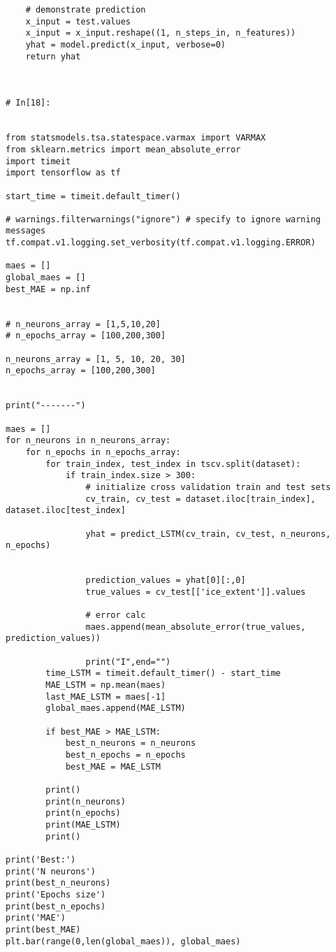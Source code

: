 \begin{verbatim}
    # demonstrate prediction
    x_input = test.values
    x_input = x_input.reshape((1, n_steps_in, n_features))
    yhat = model.predict(x_input, verbose=0)
    return yhat
    


# In[18]:


from statsmodels.tsa.statespace.varmax import VARMAX
from sklearn.metrics import mean_absolute_error
import timeit
import tensorflow as tf

start_time = timeit.default_timer()

# warnings.filterwarnings("ignore") # specify to ignore warning messages
tf.compat.v1.logging.set_verbosity(tf.compat.v1.logging.ERROR)

maes = []
global_maes = []
best_MAE = np.inf


# n_neurons_array = [1,5,10,20]
# n_epochs_array = [100,200,300]

n_neurons_array = [1, 5, 10, 20, 30]
n_epochs_array = [100,200,300]


print("-------")

maes = []
for n_neurons in n_neurons_array:
    for n_epochs in n_epochs_array:
        for train_index, test_index in tscv.split(dataset):
            if train_index.size > 300:
                # initialize cross validation train and test sets
                cv_train, cv_test = dataset.iloc[train_index], dataset.iloc[test_index]

                yhat = predict_LSTM(cv_train, cv_test, n_neurons, n_epochs)


                prediction_values = yhat[0][:,0]
                true_values = cv_test[['ice_extent']].values

                # error calc
                maes.append(mean_absolute_error(true_values, prediction_values))

                print("I",end="")
        time_LSTM = timeit.default_timer() - start_time
        MAE_LSTM = np.mean(maes)
        last_MAE_LSTM = maes[-1]
        global_maes.append(MAE_LSTM)

        if best_MAE > MAE_LSTM:
            best_n_neurons = n_neurons
            best_n_epochs = n_epochs
            best_MAE = MAE_LSTM

        print()
        print(n_neurons)
        print(n_epochs)
        print(MAE_LSTM)
        print()    

print('Best:')
print('N neurons')
print(best_n_neurons)
print('Epochs size')
print(best_n_epochs)
print('MAE')
print(best_MAE)
plt.bar(range(0,len(global_maes)), global_maes)



\end{verbatim}
